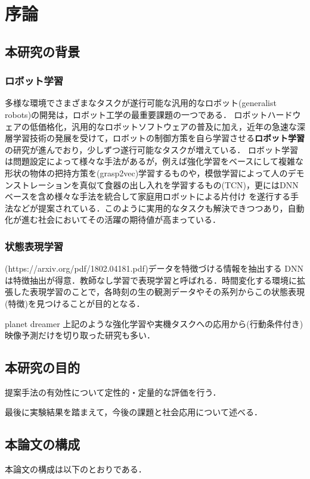 \chapter{序論}
\label{chap:introduction}
\section{本研究の背景}

\subsection{ロボット学習}

多様な環境でさまざまなタスクが遂行可能な汎用的なロボット(generalist robots)の開発は，ロボット工学の最重要課題の一つである．
ロボットハードウェアの低価格化，汎用的なロボットソフトウェアの普及に加え，近年の急速な深層学習技術の発展を受けて，ロボットの制御方策を自ら学習させる{\bf ロボット学習}の研究が進んでおり，少しずつ遂行可能なタスクが増えている．
ロボット学習は問題設定によって様々な手法があるが，例えば強化学習をベースにして複雑な形状の物体の把持方策を(grasp2vec)学習するものや，模倣学習によって人のデモンストレーションを真似て食器の出し入れを学習するもの(TCN)，更にはDNNベースを含め様々な手法を統合して家庭用ロボットによる片付け \cite{hatori2018interactively}を遂行する手法などが提案されている．このように実用的なタスクも解決できつつあり，自動化が進む社会においてその活躍の期待値が高まっている．

\subsection{状態表現学習}
(https://arxiv.org/pdf/1802.04181.pdf)データを特徴づける情報を抽出する
DNNは特徴抽出が得意．教師なし学習で表現学習と呼ばれる．時間変化する環境に拡張した表現学習のことで，各時刻の生の観測データやその系列からこの状態表現(特徴)を見つけることが目的となる．

planet dreamer
上記のような強化学習や実機タスクへの応用から(行動条件付き)映像予測だけを切り取った研究も多い．

\section{本研究の目的}


提案手法の有効性について定性的・定量的な評価を行う．

最後に実験結果を踏まえて，今後の課題と社会応用について述べる．

\section{本論文の構成}
本論文の構成は以下のとおりである．


